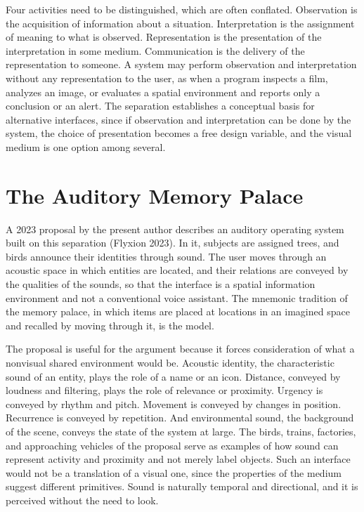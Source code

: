 \documentclass[11pt]{article}
\theoremstyle{remark}
\begin{document}
Four activities need to be distinguished, which are often conflated. Observation is the acquisition of information about a situation. Interpretation is the assignment of meaning to what is observed. Representation is the presentation of the interpretation in some medium. Communication is the delivery of the representation to someone. A system may perform observation and interpretation without any representation to the user, as when a program inspects a film, analyzes an image, or evaluates a spatial environment and reports only a conclusion or an alert. The separation establishes a conceptual basis for alternative interfaces, since if observation and interpretation can be done by the system, the choice of presentation becomes a free design variable, and the visual medium is one option among several.

\section{The Auditory Memory Palace}

A 2023 proposal by the present author describes an auditory operating system built on this separation (Flyxion 2023). In it, subjects are assigned trees, and birds announce their identities through sound. The user moves through an acoustic space in which entities are located, and their relations are conveyed by the qualities of the sounds, so that the interface is a spatial information environment and not a conventional voice assistant. The mnemonic tradition of the memory palace, in which items are placed at locations in an imagined space and recalled by moving through it, is the model.

The proposal is useful for the argument because it forces consideration of what a nonvisual shared environment would be. Acoustic identity, the characteristic sound of an entity, plays the role of a name or an icon. Distance, conveyed by loudness and filtering, plays the role of relevance or proximity. Urgency is conveyed by rhythm and pitch. Movement is conveyed by changes in position. Recurrence is conveyed by repetition. And environmental sound, the background of the scene, conveys the state of the system at large. The birds, trains, factories, and approaching vehicles of the proposal serve as examples of how sound can represent activity and proximity and not merely label objects. Such an interface would not be a translation of a visual one, since the properties of the medium suggest different primitives. Sound is naturally temporal and directional, and it is perceived without the need to look.
\end{document}
